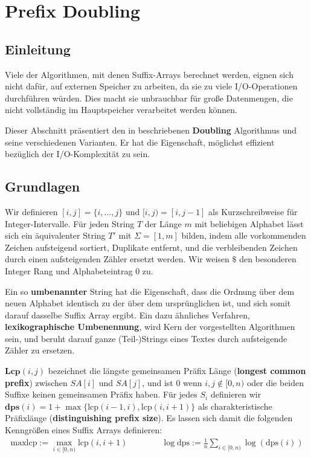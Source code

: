 \section{Prefix Doubling}

\subsection{Einleitung}

Viele  der Algorithmen, mit denen Suffix-Arrays berechnet werden, eignen sich nicht dafür, auf externen Speicher zu arbeiten, da sie zu viele I/O-Operationen durchführen würden. Dies macht sie unbrauchbar für große Datenmengen, die nicht vollständig im Hauptspeicher verarbeitet werden können.

Dieser Abschnitt präsentiert den in \cite{saca:11} beschriebenen \textbf{Doubling} Algorithmus und seine verschiedenen Varianten. Er hat die Eigenschaft, möglichst effizient bezüglich der I/O-Komplexität zu sein.

\subsection{Grundlagen}

Wir definieren $[i, j] = \{i, \dots, j\}$ und $[i, j) = [i, j - 1]$ als Kurzschreibweise für Integer-Intervalle. Für jeden String $T$ der Länge $m$ mit beliebigen Alphabet lässt sich ein äquivalenter String $T'$ mit $\Sigma = [1, m]$ bilden, indem alle vorkommenden Zeichen aufsteigend sortiert, Duplikate entfernt, und die verbleibenden Zeichen durch einen aufsteigenden Zähler ersetzt werden. Wir weisen $\$$ den besonderen Integer Rang und Alphabeteintrag $0$ zu.

Ein so \textbf{umbenannter} String hat die Eigenschaft, dass die Ordnung über dem neuen Alphabet identisch zu der über dem ursprünglichen ist, und sich somit darauf dasselbe Suffix Array ergibt. Ein dazu ähnliches Verfahren, \textbf{lexikographische Umbenennung}, wird Kern der vorgestellten Algorithmen sein, und beruht darauf ganze (Teil-)Strings eines Textes durch aufsteigende Zähler zu ersetzen.

$\textbf{Lcp}(i, j)$ bezeichnet die längste gemeinsamen Präfix Länge (\textbf{longest common prefix}) zwischen $SA[i]$ und $SA[j]$, und ist $0$ wenn $i, j \notin [0, n)$ oder die beiden Suffixe keinen gemeinsamen Präfix haben. Für jedes $S_i$ definieren wir $\textbf{dps}(i) = 1 + \max\{\text{lcp}(i - 1, i), \text{lcp}(i, i + 1)\}$ als charakteristische Präfixlänge (\textbf{distinguishing prefix size}). Es lassen sich damit die folgenden Kenngrößen eines Suffix Arrays definieren:
\begin{gather*}
\text{maxlcp} := \max_{i \in [0, n)} \text{lcp}(i, i + 1) 
\qquad\qquad
\log \text{dps} := \frac{1}{n} \sum_{i \in [0, n)} \log(\text{dps}(i))
\end{gather*}

